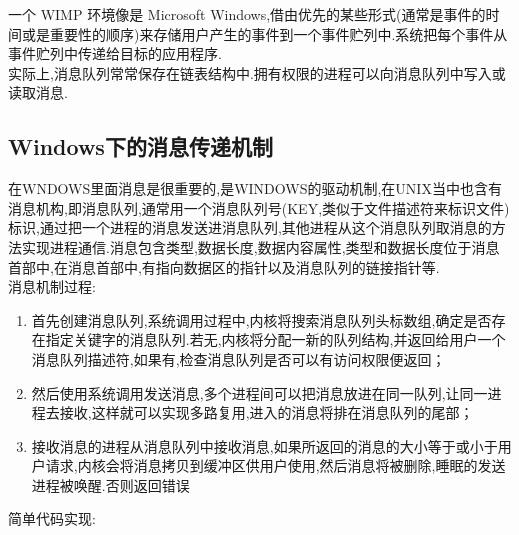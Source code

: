 \documentclass[a4paper,12pt,notitlepage]{article}
\begin{document}
	一个 WIMP 环境像是 Microsoft Windows,借由优先的某些形式(通常是事件的时间或是重要性的顺序)来存储用户产生的事件到一个事件贮列中.系统把每个事件从事件贮列中传递给目标的应用程序.\\

	实际上,消息队列常常保存在链表结构中.拥有权限的进程可以向消息队列中写入或读取消息.\\
	
\subsection{Windows下的消息传递机制}

	在WNDOWS里面消息是很重要的,是WINDOWS的驱动机制,在UNIX当中也含有消息机构,即消息队列,通常用一个消息队列号(KEY,类似于文件描述符来标识文件)标识,通过把一个进程的消息发送进消息队列,其他进程从这个消息队列取消息的方法实现进程通信.消息包含类型,数据长度,数据内容属性,类型和数据长度位于消息首部中,在消息首部中,有指向数据区的指针以及消息队列的链接指针等.\\

	消息机制过程: 

\begin{enumerate}
	\item 首先创建消息队列,系统调用过程中,内核将搜索消息队列头标数组,确定是否存在指定关键字的消息队列.若无,内核将分配一新的队列结构,并返回给用户一个消息队列描述符,如果有,检查消息队列是否可以有访问权限便返回；
	\item 然后使用系统调用发送消息,多个进程间可以把消息放进在同一队列,让同一进程去接收,这样就可以实现多路复用,进入的消息将排在消息队列的尾部；
	\item 接收消息的进程从消息队列中接收消息,如果所返回的消息的大小等于或小于用户请求,内核会将消息拷贝到缓冲区供用户使用,然后消息将被删除,睡眠的发送进程被唤醒.否则返回错误
\end{enumerate} 

	简单代码实现: \\
\end{document}
